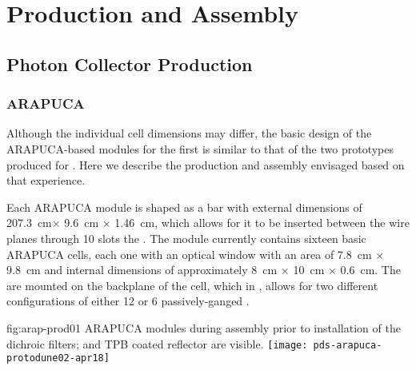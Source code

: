 \section{Production and Assembly}
\label{sec:fdsp-pd-prod-assy}


\subsection{Photon Collector Production}
\label{sec:fdsp-pd-prod-pc}

\subsubsection{ARAPUCA}
\label{ssec:fdsp-pd-pc-prod-arapuca}
Although the individual cell dimensions may differ, the basic design of the ARAPUCA-based  modules for the first   is similar to that of the two prototypes produced for . Here we describe the production and assembly envisaged based on that experience.

Each  ARAPUCA module is shaped as a bar with external dimensions of 
\SI{207.3}{cm}$ \times$ \SI{9.6}{cm} $\times$ \SI{1.46}{cm}, which allows for it to be inserted between the wire planes through 10 slots the . The module currently contains sixteen basic ARAPUCA cells, each one with an optical window with an area of \SI{7.8}{cm} $\times$ \SI{9.8}{cm} and internal dimensions of approximately \SI{8}{cm} $\times$ \SI{10}{cm} $\times$ \SI{0.6}{cm}. The  are mounted on the backplane of the cell, which in , allows for  two different configurations of either 12 or 6 passively-ganged .

\begin{dunefigure}{fig:arap-prod01}
{ ARAPUCA modules during assembly prior to installation of the dichroic filters;  and TPB coated reflector are visible.}
  \texttt{[image: pds-arapuca-protodune02-apr18]}
\end{dunefigure}

